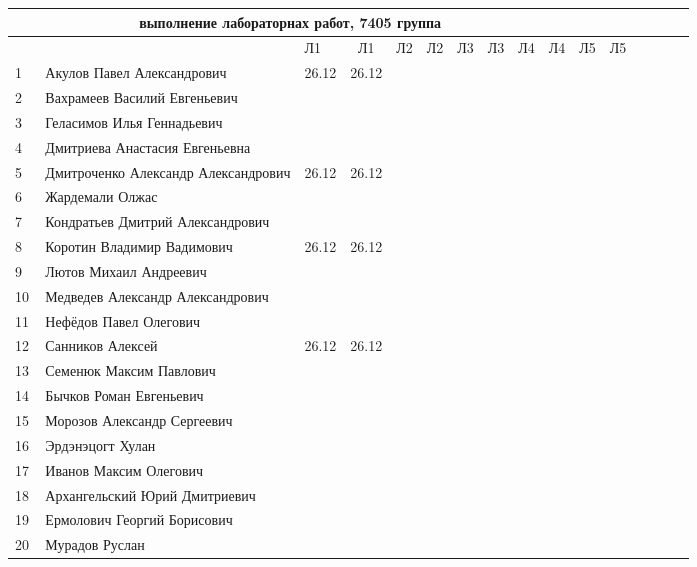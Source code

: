 \documentclass[a4paper,landscape,11pt]{article}
\begin{document}
\newpage
%
\hspace{-4.1cm} %
\begin{tabular}{l|llccccccccccccc}
\multicolumn{10}{c}{выполнение лабораторнах работ, 7405 группа} \\
\toprule
&&Л1&Л1& Л2&Л2& Л3&Л3& Л4&Л4&Л5&Л5\\
\midrule
1\,& Акулов Павел Александрович            &26.12&26.12&&&&&&\\
2\,& Вахрамеев Василий Евгеньевич          &&&&&&&&\\
3\,& Геласимов Илья Геннадьевич            &&&&&&&&\\
4\,& Дмитриева Анастасия Евгеньевна        &&&&&&&&\\
5\,& Дмитроченко Александр Александрович   &26.12&26.12&&&&&&\\
\midrule
6\,& Жардемали Олжас   &&&&&&&&\\
7\,& Кондратьев Дмитрий Александрович      &&&&&&&&\\
8\,& Коротин Владимир Вадимович            &26.12&26.12&&&&&&\\
9\,& Лютов Михаил Андреевич                &&&&&&&&\\
10\,&Медведев Александр Александрович      &&&&&&&&\\
\midrule
11\,&Нефёдов Павел Олегович                &&&&&&&&\\
12\,&Санников Алексей                      &26.12&26.12&&&&&&\\
13\,&Семенюк Максим Павлович               &&&&&&&&\\
14\,&Бычков Роман Евгеньевич               &&&&&&&&\\
15\,&Морозов Александр Сергеевич           &&&&&&&&\\
\midrule
16\,&Эрдэнэцогт Хулан                      &&&&&&&&\\
17\,&Иванов Максим Олегович                &&&&&&&&\\
18\,&Архангельский Юрий Дмитриевич         &&&&&&&&\\ 
19\,&Ермолович Георгий Борисович           &&&&&&&&\\
20\,& Мурадов Руслан                       &&&&&&&&\\
\bottomrule
\end{tabular}
\end{document}
